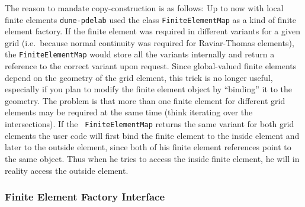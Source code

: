 \documentclass[a4paper,11pt]{article}
\newcommand{\modulename}[1]{\texttt{#1}\xspace}
\begin{document}
The reason to mandate copy-construction is as follows: Up to now with local
finite elements \modulename{dune-pdelab} used the class {\tt FiniteElementMap}
as a kind of finite element factory.  If the finite element was required in
different variants for a given grid (i.e.\ because normal continuity was
required for Raviar-Thomas elements), the {\tt FiniteElementMap} would store
all the variants internally and return a reference to the correct variant upon
request.  Since global-valued finite elements depend on the geometry of the
grid element, this trick is no longer useful, especially if you plan to modify
the finite element object by ``binding'' it to the geometry.  The problem is
that more than one finite element for different grid elements may be required
at the same time (think iterating over the intersections).  If the {\tt
  FiniteElementMap} returns the same variant for both grid elements the user
code will first bind the finite element to the inside element and later to the
outside element, since both of his finite element references point to the same
object.  Thus when he tries to access the inside finite element, he will in
reality access the outside element.

\subsubsection{Finite Element Factory Interface}
\end{document}
